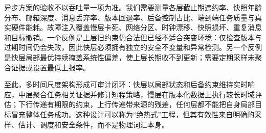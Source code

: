 异步方案的验收不以吞吐量一项为准。我们需要测量各层截止期违约率、快照年龄分布、邮箱深度、消息丢弃率、版本回退率、后备控制占比、端到端任务质量与真实硬件能耗。故障注入覆盖慢层卡死、网络分区、时钟漂移、快照损坏、重复消息和目标撤销。一个反例是上层旧约束仍合法但已经不适合突变环境：仅检查版本与过期时间仍会失败，因此快层必须拥有独立的安全不变量和异常检测。另一个反例是快层局部最优持续掩盖系统性偏差，使上层长期收不到更新；需要定期采样未聚合证据或设置最低上报率。

至此，多时间尺度架构形成可审计闭环：快层以局部状态和后备约束维持实时响应，中层聚合任务相关证据并修订短程策略，慢层在版本化数据上执行较长时域评估；下行传递有期限的约束，上行传递带来源的残差，任何层都不能把自身局部目标冒充整体任务成功。这种设计可以称为“绝热式”工程，但其有效性来自明确的采样、估计、调度和安全条件，而不是物理词汇本身。
